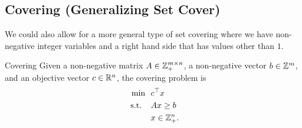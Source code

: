 




\subsection{Covering (Generalizing Set Cover)}
We could also allow for a more general type of set covering where we have non-negative integer variables and a right hand side that has values other than $1$.
\begin{general}{Covering}{\npcomplete}
\label{general:covering}
Given a non-negative matrix $A \in \mathbb{Z}_+^{m \times n}$, a non-negative vector $b \in \mathbb{Z}^m$, and an objective vector $c \in \mathbb{R}^n$, the covering problem is
\begin{equation}
\begin{split}
\min \ \ & c^\top x\\
\text{ s.t. } \ \ & Ax \geq b \\
& x \in\mathbb{Z}^n_+.
\end{split}
\end{equation}
\end{general}






